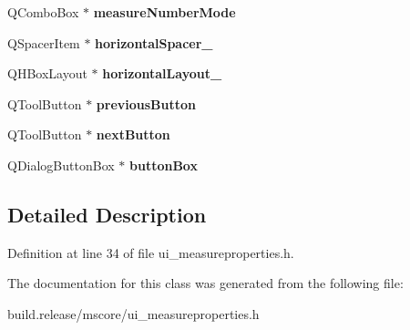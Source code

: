\begin{DoxyCompactItemize}
\item 
\mbox{\label{class_ui___measure_properties_base_a2cc3691df45bab5024e613fe3bb386d9}} 
Q\+Combo\+Box $\ast$ {\bfseries measure\+Number\+Mode}
\item 
\mbox{\label{class_ui___measure_properties_base_a778a7ba99dec73773a471bd66dbb2fb4}} 
Q\+Spacer\+Item $\ast$ {\bfseries horizontal\+Spacer\+\_}
\item 
\mbox{\label{class_ui___measure_properties_base_ac838c75eb26ebd2483b830b46396c4dd}} 
Q\+H\+Box\+Layout $\ast$ {\bfseries horizontal\+Layout\+\_}
\item 
\mbox{\label{class_ui___measure_properties_base_a65a0f532ea9e5a5c1a8fe3475b808bba}} 
Q\+Tool\+Button $\ast$ {\bfseries previous\+Button}
\item 
\mbox{\label{class_ui___measure_properties_base_a71684d1ddad9c22e1e9dfd83658b4e74}} 
Q\+Tool\+Button $\ast$ {\bfseries next\+Button}
\item 
\mbox{\label{class_ui___measure_properties_base_afa9b6eda732ae89b3bbe31cdfe3076bf}} 
Q\+Dialog\+Button\+Box $\ast$ {\bfseries button\+Box}
\end{DoxyCompactItemize}


\subsection{Detailed Description}


Definition at line 34 of file ui\+\_\+measureproperties.\+h.



The documentation for this class was generated from the following file\+:\begin{DoxyCompactItemize}
\item 
build.\+release/mscore/ui\+\_\+measureproperties.\+h\end{DoxyCompactItemize}
